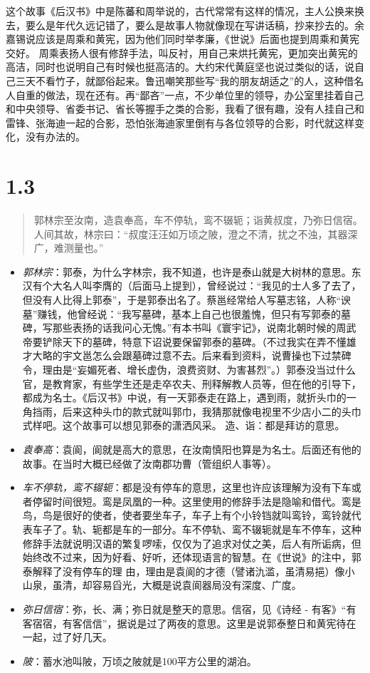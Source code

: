 \documentclass[]{book}
\providecommand{\tightlist}{%
  \setlength{\itemsep}{0pt}\setlength{\parskip}{0pt}}
\begin{document}
这个故事《后汉书》中是陈蕃和周举说的，古代常常有这样的情况，主人公换来换去，要么是年代久远记错了，要么是故事人物就像现在写讲话稿，抄来抄去的。余嘉锡说应该是周乘和黄宪，因为他们同时举孝廉，《世说》后面也提到周乘和黄宪交好。
周乘表扬人很有修辞手法，叫反衬，用自己来烘托黄宪，更加突出黄宪的高洁，同时也说明自己有时候也挺高洁的。大约宋代黄庭坚也说过类似的话，说自己三天不看竹子，就鄙俗起来。鲁迅嘲笑那些写``我的朋友胡适之''的人，这种借名人自重的做法，现在还有。再``鄙吝''一点，不少单位里的领导，办公室里挂着自己和中央领导、省委书记、省长等握手之类的合影，我看了很有趣，没有人挂自己和雷锋、张海迪一起的合影，恐怕张海迪家里倒有与各位领导的合影，时代就这样变化，没有办法的。

\section{1.3}\label{section-2}

\begin{quote}
郭林宗至汝南，造袁奉高，车不停轨，鸾不辍轭；诣黄叔度，乃弥日信宿。人间其故，林宗曰：``叔度汪汪如万顷之陂，澄之不清，扰之不浊，其器深广，难测量也。''
\end{quote}

\begin{itemize}
\tightlist
\item
  \emph{郭林宗}：郭泰，为什么字林宗，我不知道，也许是泰山就是大树林的意思。东汉有个大名人叫李膺的（后面马上提到），曾经说过：``我见的士人多了去了，但没有人比得上郭泰''，于是郭泰出名了。蔡邕经常给人写墓志铭，人称``谀墓''赚钱，他曾经说：``我写墓碑，基本上自己也很羞愧，但只有写郭泰的墓碑，写那些表扬的话我问心无愧。''有本书叫《寰宇记》，说南北朝时候的周武帝要铲除天下的墓碑，特意下诏说要保留郭泰的墓碑。（不过我实在弄不懂雄才大略的宇文邕怎么会跟墓碑过意不去。后来看到资料，说曹操也下过禁碑令，理由是``妄媚死者、增长虚伪，浪费资财、为害甚烈''。）郭泰没当过什么官，是教育家，有些学生还是走卒农夫、刑释解教人员等，但在他的引导下，都成为名士。《后汉书》中说，有一天郭泰走在路上，遇到雨，就折头巾的一角挡雨，后来这种头巾的款式就叫郭巾，我猜那就像电视里不少店小二的头巾式样吧。这个故事可以想见郭泰的潇洒风采。
  造、诣：都是拜访的意思。
\item
  \emph{袁奉高}：袁阆，阆就是高大的意思，在汝南慎阳也算是为名士。后面还有他的故事。在当时大概已经做了汝南郡功曹（管组织人事等）。
\item
  \emph{车不停轨，鸾不辍轭}：都是没有停车的意思，这里也许应该理解为没有下车或者停留时间很短。鸾是凤凰的一种。这里使用的修辞手法是隐喻和借代。鸾是鸟，鸟是很好的使者，使者要坐车子，车子上有个小铃铛就叫鸾铃，鸾铃就代表车子了。轨、轭都是车的一部分。车不停轨、鸾不辍轭就是车不停车，这种修辞手法就说明汉语的繁复啰嗦，仅仅为了追求对仗之美，后人有所诟病，但始终改不过来，因为好看、好听，还体现语言的智慧。在《世说》的注中，郭泰解释了没有停车的理
  由，理由是袁阆的才德（譬诸氿滥，虽清易挹）像小山泉，虽清，却容易舀光，大概是说袁阆器局没有深度、广度。
\item
  \emph{弥日信宿}：弥，长、满；弥日就是整天的意思。信宿，见《诗经 -
  有客》``有客宿宿，有客信信''，据说是过了两夜的意思。这里是说郭泰整日和黄宪待在一起，过了好几天。
\item
  \emph{陂}：蓄水池叫陂，万顷之陂就是100平方公里的湖泊。
\end{itemize}
\end{document}
